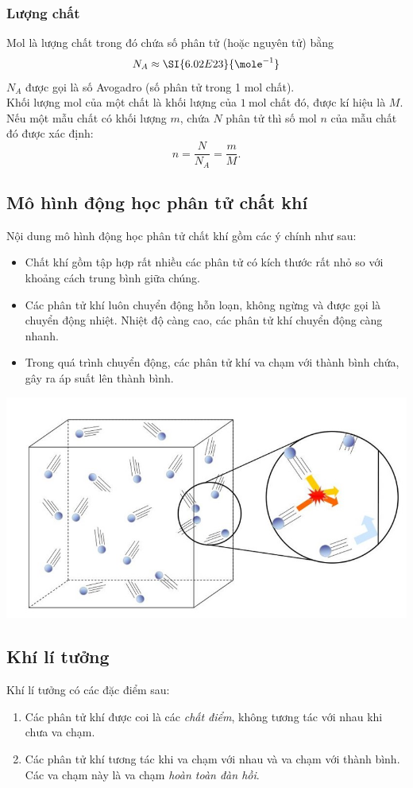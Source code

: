 \subsubsection{Lượng chất}
Mol là lượng chất trong đó chứa số phân tử (hoặc nguyên tử) bằng 
$$N_A\approx\SI{6.02E23}{\mole^{-1}}$$
$N_A$ được gọi là số Avogadro (số phân tử trong 1 mol chất).\\
Khối lượng mol của một chất là khối lượng của $\SI{1}{\mole}$ chất đó, được kí hiệu là $M$.\\
Nếu một mẫu chất có khối lượng $m$, chứa $N$ phân tử thì số mol $n$ của mẫu chất đó được xác định:
$$n=\dfrac{N}{N_A}=\dfrac{m}{M}.$$
\subsection{Mô hình động học phân tử chất khí}
Nội dung mô hình động học phân tử chất khí gồm các ý chính như sau:
\begin{itemize}
	\item Chất khí gồm tập hợp rất nhiều các phân tử có kích thước rất nhỏ so với khoảng cách trung bình giữa chúng.
	\item Các phân tử khí luôn chuyển động hỗn loạn, không ngừng và được gọi là chuyển động nhiệt. Nhiệt độ càng cao, các phân tử khí chuyển động càng nhanh.
	\item Trong quá trình chuyển động, các phân tử khí va chạm với thành bình chứa, gây ra áp suất lên thành bình.
\end{itemize}
\begin{center}
	\includegraphics[width=0.4\linewidth]{../figs/VN12-Y24-PH-SYL-009-2}
\end{center}
\subsection{Khí lí tưởng}
Khí lí tưởng có các đặc điểm sau:
\begin{enumerate}[label=\arabic*.]
	\item Các phân tử khí được coi là các \textit{chất điểm}, không tương tác với nhau khi chưa va chạm.
	\item Các phân tử khí tương tác khi va chạm với nhau và va chạm với thành bình. Các va chạm này là va chạm \textit{hoàn toàn đàn hồi}.
\end{enumerate}
